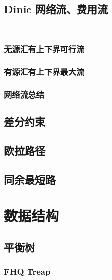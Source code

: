 \documentclass[10pt, a4paper, oneside]{ctexart}
\begin{document}
\begin{multicols}{2}
        \subsection{Dinic 网络流、费用流}
        \inputminted{cpp}{src/graph/dinic-flow.cpp}
        \inputminted{cpp}{src/graph/dinic-cost.cpp}
        \subsubsection{无源汇有上下界可行流}
        
        \subsubsection{有源汇有上下界最大流}
        
        \subsubsection{网络流总结}
        \subsection{差分约束}
        
        \subsection{欧拉路径}
        
        \subsection{同余最短路}
        

        \section{数据结构}
        \subsection{平衡树}
        \subsubsection{FHQ Treap}
        \inputminted{cpp}{src/data structure/fhq.cpp}

\end{multicols}
\end{document}
